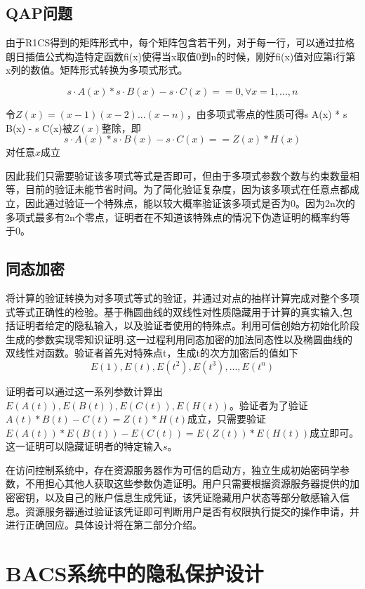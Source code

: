 \subsection{QAP问题}

由于R1CS得到的矩阵形式中，每个矩阵包含若干列，对于每一行，可以通过拉格朗日插值公式构造特定函数fi(x)使得当x取值0到n的时候，刚好fi(x)值对应第i行第x列的数值。矩阵形式转换为多项式形式。

$$s \cdot A(x) * s \cdot B(x) - s \cdot C(x) == 0, \forall x = 1, ... , n$$

令$Z(x) = (x-1)(x-2)...(x-n)$，由多项式零点的性质可得s \cdot A(x) * s \cdot B(x) - s \cdot C(x)被$Z(x)$整除，即
$$s \cdot A(x) * s \cdot B(x) - s \cdot C(x) == Z(x)*H(x)$$ 对任意$x$成立

因此我们只需要验证该多项式等式是否即可，但由于多项式参数个数与约束数量相等，目前的验证未能节省时间。为了简化验证复杂度，因为该多项式在任意点都成立，因此通过验证一个特殊点，能以较大概率验证该多项式是否为0。因为2n次的多项式最多有2n个零点，证明者在不知道该特殊点的情况下伪造证明的概率约等于0。

\subsection{同态加密}

将计算的验证转换为对多项式等式的验证，并通过对点的抽样计算完成对整个多项式等式正确性的检验。基于椭圆曲线的双线性对性质隐藏用于计算的真实输入,包括证明者给定的隐私输入，以及验证者使用的特殊点。利用可信创始方初始化阶段生成的参数实现零知识证明.这一过程利用同态加密的加法同态性以及椭圆曲线的双线性对函数。验证者首先对特殊点t，生成t的次方加密后的值如下
$$E(1),E(t), E(t^2), E(t^3),..., E(t^n)$$

证明者可以通过这一系列参数计算出$E(A(t)),E(B(t)),E(C(t)),E(H(t))$。验证者为了验证$A(t)*B(t)-C(t) = Z(t)*H(t)$成立，只需要验证$E(A(t))*E(B(t))-E(C(t)) = E(Z(t))*E(H(t))$成立即可。这一证明可以隐藏证明者的特定输入$s$。

在访问控制系统中，存在资源服务器作为可信的启动方，独立生成初始密码学参数，不用担心其他人获取这些参数伪造证明。用户只需要根据资源服务器提供的加密密钥，以及自己的账户信息生成凭证，该凭证隐藏用户状态等部分敏感输入信息。资源服务器通过验证该凭证即可判断用户是否有权限执行提交的操作申请，并进行正确回应。具体设计将在第二部分介绍。

\section{BACS系统中的隐私保护设计}

